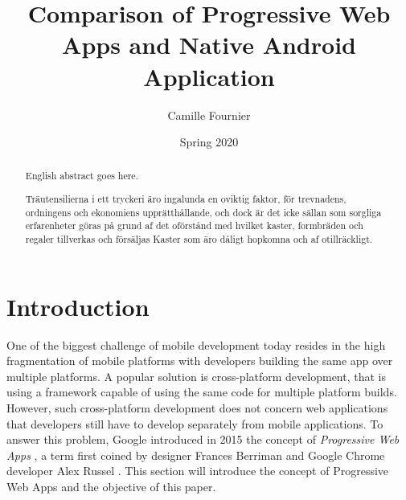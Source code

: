\documentclass{kththesis}
\title{Comparison of Progressive Web Apps and Native Android Application}
\author{Camille Fournier}
\date{Spring 2020}
\begin{document}
\sloppy %


\frontmatter

\titlepage

\begin{abstract}
  English abstract goes here.

  \blindtext
\end{abstract}


\begin{otherlanguage}{swedish}
  \begin{abstract}
    Träutensilierna i ett tryckeri äro ingalunda en oviktig faktor,
    för trevnadens, ordningens och ekonomiens upprätthållande, och
    dock är det icke sällan som sorgliga erfarenheter göras på grund
    af det oförstånd med hvilket kaster, formbräden och regaler
    tillverkas och försäljas Kaster som äro dåligt hopkomna och af
    otillräckligt.
  \end{abstract}
\end{otherlanguage}


\tableofcontents


\mainmatter


\chapter{Introduction}


\indent 

One of the biggest challenge of mobile development today resides in the high fragmentation of mobile platforms \cite{MobileDevChallenges} with developers building the same app over multiple platforms. A popular solution is cross-platform development, that is using a framework capable of using the same code for multiple platform builds.  However, such cross-platform development does not concern web applications that developers still have to develop separately from mobile applications. To answer this problem, Google introduced in 2015 the concept of \textit{Progressive Web Apps} \cite{PWA_intro}, a term first coined by designer Frances Berriman and Google Chrome  developer Alex Russel \cite{PWA_blog} \cite{PWApossibleUnifer}.
This section will introduce the concept of Progressive Web Apps and the objective of this paper.
\end{document}
